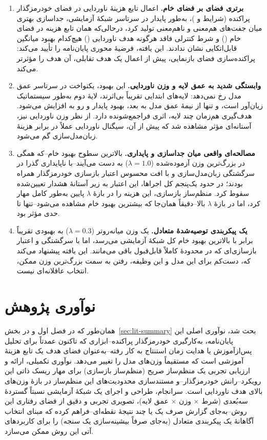 \begin{enumerate}
\item \textbf{برتری فضای  بر فضای خام.} اعمال تابع هزینهٔ ناوردایی در فضای خودرمزگذار پراکنده (شرایط  و )، به‌طور پایدار در سرتاسر شبکهٔ آزمایشی، جداسازی بهتری میان جفت‌های هم‌معنی و ناهم‌معنی تولید کرد، درحالی‌که همان تابع هزینه در فضای خام () و شرط کنترلی فاقد هرگونه هدف ناوردایی () هیچ‌کدام بهبود میانگین قابل‌اتکایی نشان ندادند. این یافته، فرضیهٔ محوری پایان‌نامه را تأیید می‌کند: پراکنده‌سازی فضای بازنمایی، پیش از اعمال یک هدف تقابلی، آن هدف را مؤثرتر می‌کند.
\item \textbf{وابستگی شدید به عمق لایه و وزن ناوردایی.} این بهبود، یکنواخت در سرتاسر عمق مدل رخ نمی‌دهد: لایه‌های ابتدایی تقریباً بی‌اثرند، لایهٔ دوم به‌طور سیستماتیک زیان‌آور است، و تنها از نیمهٔ عمق مدل به بعد، بهبود پایدار و رو به افزایش می‌شود. هدف‌گیری هم‌زمان چند لایه، اثری فراجمع‌شونده دارد. از نظر وزن ناوردایی نیز، آستانه‌ای مؤثر مشاهده شد که پیش از آن، سیگنال ناوردایی عملاً در برابر هزینهٔ زبان‌مدل‌سازی گم می‌شود.
\item \textbf{مصالحه‌ای واقعی میان جداسازی و پایداری.} بالاترین سطوح بهبود خام--که همگی در بزرگ‌ترین وزن آزموده‌شده
($\lambda=1.0$) به دست می‌آیند--با ناپایداری گذرا در سرگشتگی زبان‌مدل‌سازی و با افت محسوس اعتبار بازسازی خودرمزگذار همراه بودند؛ در حدود یک‌پنجم کل اجراها، این اعتبار به زیر آستانهٔ هشدار تعیین‌شده سقوط کرد. منظم‌ساز بازسازی، این هزینه را در بازهٔ
$\lambda$
پایین به‌طور کامل مهار کرد، اما در بازهٔ
$\lambda$
بالا--دقیقاً همان‌جا که بیشترین بهبود خام مشاهده می‌شود--تنها تا حدی مؤثر بود.
\item \textbf{یک پیکربندی توصیه‌شدهٔ متعادل.} یک وزن میانه‌رو‌تر
($\lambda=0.3$) به بهبودی تقریباً برابر با بالاترین بهبود خام کل شبکهٔ آزمایشی می‌رسد، اما با سرگشتگی و اعتبار بازسازی‌ای که در محدودهٔ کاملاً قابل‌قبول باقی می‌مانند. این یافته پیشنهاد می‌کند که، دست‌کم برای این مدل و این وظیفه، رفتن به سمت بزرگ‌ترین وزن ممکن، انتخاب عاقلانه‌ای نیست.
\end{enumerate}

\section{نوآوری پژوهش}
همان‌طور که در فصل اول و در بخش~\ref{sec:lit-summary} بحث شد، نوآوری اصلی این پایان‌نامه، به‌کارگیری خودرمزگذار پراکنده--ابزاری که تاکنون عمدتاً برای تحلیل پس‌ازآموزش یا هدایت زمان استنتاج به کار رفته--به‌عنوان فضای هدف یک تابع هزینهٔ آموزشی است که مستقیماً وزن‌های مدل را تغییر می‌دهد. نوآوری تکمیلی، ارائه و ارزیابی تجربی یک منظم‌ساز صریح (منظم‌ساز بازسازی) برای مهار ریسک ذاتی این رویکرد--رانش خودرمزگذار--و مستندسازی محدودیت‌های این منظم‌ساز در بازهٔ وزن‌های بالای هدف ناوردایی است. سرانجام، طراحی و اجرای یک شبکهٔ آزمایشی نسبتاً گستردهٔ سه‌بُعدی (شرط × وزن × عمق لایه)، تصویری تجربی و دقیق از فضای رفتاری این روش--به‌جای گزارش صرف یک یا چند نتیجهٔ نقطه‌ای--فراهم کرده که مبنای انتخاب آگاهانهٔ یک پیکربندی متعادل (به‌جای صرفاً بیشینه‌سازی یک سنجه) را برای کاربردهای آتی این روش ممکن می‌سازد.

